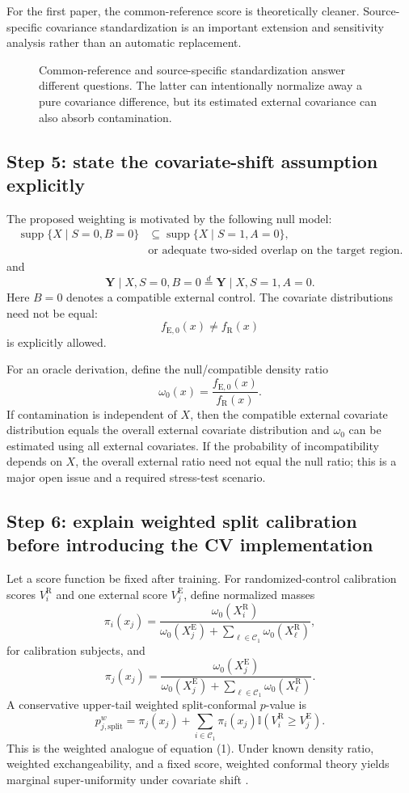 \documentclass[11pt]{article}
\newcommand{\R}{\mathrm{R}}
\newcommand{\E}{\mathrm{E}}
\newcommand{\supp}{\operatorname{supp}}
\newcommand{\ind}{\mathbb{I}}
\newcommand{\fullfig}[1]{\resizebox{\linewidth}{!}{}}
\begin{document}
For the first paper, the common-reference score is theoretically cleaner. Source-specific covariance standardization is an important extension and sensitivity analysis rather than an automatic replacement.

\begin{figure}[!ht]
\centering
\fullfig{covariance_targets.tex}
\caption{Common-reference and source-specific standardization answer different questions. The latter can intentionally normalize away a pure covariance difference, but its estimated external covariance can also absorb contamination.}
\label{fig:covariance-targets}
\end{figure}

\subsection{Step 5: state the covariate-shift assumption explicitly}

The proposed weighting is motivated by the following null model:
\[
\begin{aligned}
\supp\{X\mid S=0,B=0\}&\subseteq \supp\{X\mid S=1,A=0\},\\
&\text{or adequate two-sided overlap on the target region}.
\end{aligned}
\tag{8}
\]
and
\[
\bm Y\mid X,S=0,B=0
\overset d=
\bm Y\mid X,S=1,A=0.
\tag{9}
\]
Here $B=0$ denotes a compatible external control. The covariate distributions need not be equal:
\[
f_{\E,0}(x)\neq f_{\R}(x)
\]
is explicitly allowed.

For an oracle derivation, define the null/compatible density ratio
\[
\omega_0(x)=\frac{f_{\E,0}(x)}{f_{\R}(x)}.
\tag{10}
\]
If contamination is independent of $X$, then the compatible external covariate distribution equals the overall external covariate distribution and $\omega_0$ can be estimated using all external covariates. If the probability of incompatibility depends on $X$, the overall external ratio need not equal the null ratio; this is a major open issue and a required stress-test scenario.

\subsection{Step 6: explain weighted split calibration before introducing the CV implementation}

Let a score function be fixed after training. For randomized-control calibration scores $V_i^{\R}$ and one external score $V_j^{\E}$, define normalized masses
\[
\pi_i(x_j)
=
\frac{\omega_0(X_i^{\R})}
{\omega_0(X_j^{\E})+\sum_{\ell\in\mathcal C_1}\omega_0(X_\ell^{\R})},
\]
for calibration subjects, and
\[
\pi_j(x_j)
=
\frac{\omega_0(X_j^{\E})}
{\omega_0(X_j^{\E})+\sum_{\ell\in\mathcal C_1}\omega_0(X_\ell^{\R})}.
\]
A conservative upper-tail weighted split-conformal $p$-value is
\[
p_{j,\mathrm{split}}^{w}
=
\pi_j(x_j)
+
\sum_{i\in\mathcal C_1}\pi_i(x_j)
\ind(V_i^{\R}\ge V_j^{\E}).
\tag{11}
\]
This is the weighted analogue of equation (1). Under known density ratio, weighted exchangeability, and a fixed score, weighted conformal theory yields marginal super-uniformity under covariate shift \citep{tibshirani2019weighted,jin2026weighted}.
\end{document}
